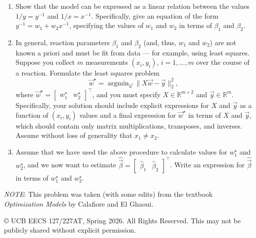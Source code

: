 \documentclass[10pt]{article}
\theoremstyle{definition}
\theoremstyle{plain}
\newcommand{\RR}{\mathbb{R}}
\DeclareMathOperator{\argmin}{argmin}
\begin{document}
\begin{enumerate}[label=(\alph*)]
    \item Show that the model can be expressed as a linear relation between the values $1/y = y^{-1}$ and $1/x = x^{-1}$. Specifically, give an equation of the form $y^{-1} = w_1 + w_2 x^{-1}$, specifying the values of $w_1$ and $w_2$ in terms of $\beta_1$ and $\beta_2$.

    \item In general, reaction parameters $\beta_1$ and $\beta_2$ (and, thus, $w_1$ and $w_2$) are not known a priori and must be fit from data --- for example, using least squares. Suppose you collect $m$ measurements $(x_i, y_i)$, $i = 1, \ldots, m$ over the course of a reaction. Formulate the least squares problem
    \begin{equation}
        \vec{w}^\star = \argmin_{\vec{w}} \|X\vec{w} - \vec{y}\|_2^2,
    \end{equation}
    where $\vec{w}^\star = \begin{bmatrix} w_1^\star & w_2^\star \end{bmatrix}^\top$, and you must specify $X \in \RR^{m \times 2}$ and $\vec{y} \in \RR^m$. Specifically, your solution should include explicit expressions for $X$ and $\vec{y}$ as a function of $(x_i, y_i)$ values and a final expression for $\vec{w}^\star$ in terms of $X$ and $\vec{y}$, which should contain only matrix multiplications, transposes, and inverses. Assume without loss of generality that $x_1 \neq x_2$.

    \item Assume that we have used the above procedure to calculate values for $w_1^\star$ and $w_2^\star$, and we now want to estimate $\widehat{\vec{\beta}} = \begin{bmatrix} \hat{\beta}_1 & \hat{\beta}_2 \end{bmatrix}^\top$. Write an expression for $\widehat{\vec{\beta}}$ in terms of $w_1^\star$ and $w_2^\star$.
\end{enumerate}

\vspace{1em}
\noindent\textit{NOTE}: This problem was taken (with some edits) from the textbook \textit{Optimization Models} by Calafiore and El Ghaoui.

\vfill
\noindent\footnotesize{\copyright{} UCB EECS 127/227AT, Spring 2026. \scriptsize{All Rights Reserved. This may not be publicly shared without explicit permission.}}

\newpage
\end{document}
